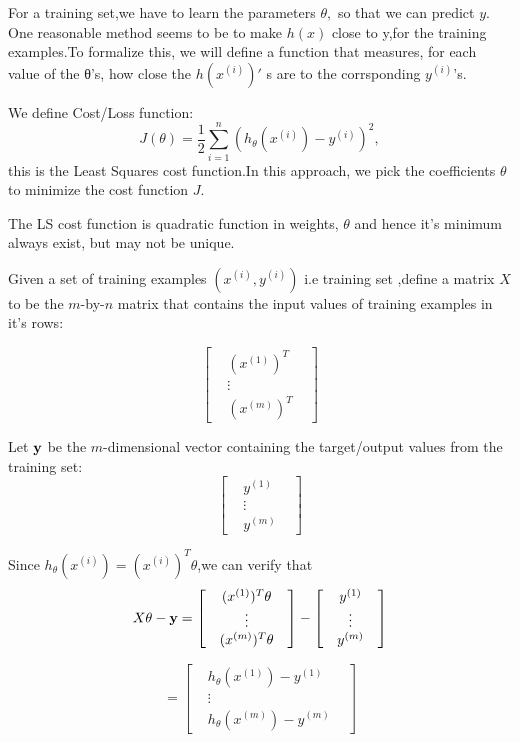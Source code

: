 \documentclass[12pt]{article}
\begin{document}
For a training set,we have to  learn the parameters $\theta,$ so that we can predict $y$. One reasonable method seems to be to make $h(x)$ close to y,for the training examples.To formalize this, we will define a function that measures, for each value of the θ’s, how close the $h(x^{(i)})'$ s are to the corrsponding $y^{(i)}$'s.

We  define Cost/Loss function: $$J(\theta)=\frac{1}{2}\sum_{i=1}^{n}(h_{\theta}(x^{(i)})-y^{(i)})^{2},$$this is the Least Squares cost function.In this approach, we pick the coefficients $\theta$ to minimize the cost function $J$.
 
The LS cost function is quadratic function in weights, $\theta$ and hence it's minimum always exist, but may not be unique.
 
 
 
 
 
Given a set of training examples $(x^{(i)},y^{(i)})$ i.e training set ,define a matrix $X$ to be the $m$-by-$n$ matrix  that contains the input values of training examples in it's rows:  

 $$ \begin{bmatrix} 
  & {(x^{(1)})^{T}} &  \\
  & \vdots & \\
  &   (x^{(m)})^{T}     &  
  \end{bmatrix} $$
 
 
Let $ \textbf y$ be the $m$-dimensional vector containing the target/output values from the training set:
 $$\begin{bmatrix} 
 & y^{(1)} &  \\
 & \vdots & \\
 &   y^{(m)}     &  
 \end{bmatrix}$$
 
 
Since $h_{\theta}(x^{(i)})=(x^{(i)})^{T}\theta$,we can verify that
 $$X \theta - \textbf y = \begin{bmatrix} 
 & {(x^{(1)})^{T}}\theta &  \\
 & \vdots & \\
 &   (x^{(m)})^{T} \theta    &  
 \end{bmatrix} - \begin{bmatrix} 
 & y^{(1)} &  \\
 & \vdots & \\
 &   y^{(m)}     &  
 \end{bmatrix}$$
 
 $$=\begin{bmatrix} 
 & h_{\theta}(x^{(1)})-y^{(1)} &  \\
 & \vdots & \\
 &  h_{\theta}(x^{(m)})- y^{(m)}     &  
 \end{bmatrix}$$
 
\end{document}
